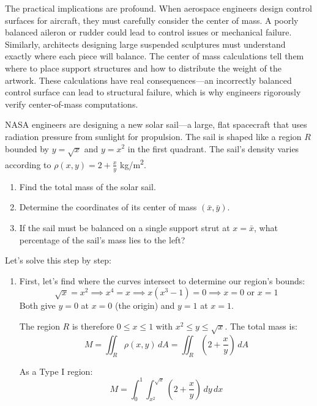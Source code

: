 \noindent The practical implications are profound. When aerospace engineers design control surfaces for aircraft, they must carefully consider the center of mass. A poorly balanced aileron or rudder could lead to control issues or mechanical failure. Similarly, architects designing large suspended sculptures must understand exactly where each piece will balance. The center of mass calculations tell them where to place support structures and how to distribute the weight of the artwork. These calculations have real consequences---an incorrectly balanced control surface can lead to structural failure, which is why engineers rigorously verify center-of-mass computations.

\exampleline
\begin{example}
NASA engineers are designing a new solar sail---a large, flat spacecraft that uses radiation pressure from sunlight for propulsion. The sail is shaped like a region $R$ bounded by $y = \sqrt{x}$ and $y = x^2$ in the first quadrant. The sail's density varies according to $\rho(x,y) = 2 + \frac{x}{y}$ kg/m\textsuperscript{2}.

\begin{enumerate}
    \item Find the total mass of the solar sail.
    \item Determine the coordinates of its center of mass $(\bar{x}, \bar{y})$.
    \item If the sail must be balanced on a single support strut at $x = \bar{x}$, what percentage of the sail's mass lies to the left?
\end{enumerate}

\begin{solution}
Let's solve this step by step:

\begin{enumerate}
    \item First, let's find where the curves intersect to determine our region's bounds:
    \[
    \sqrt{x} = x^2 \implies x^4 = x \implies x(x^3 - 1) = 0 \implies x = 0 \text{ or } x = 1
    \]
    Both give $y = 0$ at $x = 0$ (the origin) and $y = 1$ at $x = 1$.

    The region $R$ is therefore $0 \le x \le 1$ with $x^2 \le y \le \sqrt{x}$. The total mass is:
    \[
    M = \iint_R \rho(x,y)\,dA = \iint_R \left(2 + \frac{x}{y}\right)\,dA
    \]
    
    As a Type I region:
    \[
    M = \int_0^1 \int_{x^2}^{\sqrt{x}} \left(2 + \frac{x}{y}\right)\,dy\,dx
    \]
    

\end{enumerate}
\end{solution}
\end{example}
